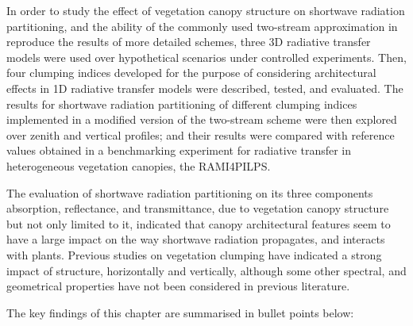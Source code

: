 In order to study the effect of vegetation canopy structure on shortwave radiation partitioning, and the ability of the commonly used two-stream approximation in reproduce the results of more detailed schemes, three 3D radiative transfer models were used over hypothetical scenarios under controlled experiments. Then, four clumping indices developed for the purpose of considering architectural effects in 1D radiative transfer models were described, tested, and evaluated. The results for shortwave radiation partitioning of different clumping indices implemented in a modified version of the two-stream scheme were then explored over zenith and vertical profiles; and their results were compared with reference values obtained in a benchmarking experiment for radiative transfer in heterogeneous vegetation canopies, the RAMI4PILPS.

The evaluation of shortwave radiation partitioning on its three components absorption, reflectance, and transmittance, due to vegetation canopy structure but not only limited to it, indicated that canopy architectural features seem to have a large impact on the way shortwave radiation propagates, and interacts with plants. Previous studies on vegetation clumping \citep{Chen2008} have indicated a strong impact of structure, horizontally and vertically, although some other spectral, and geometrical properties have not been considered in previous literature. 

The key findings of this chapter are summarised in bullet points below:

